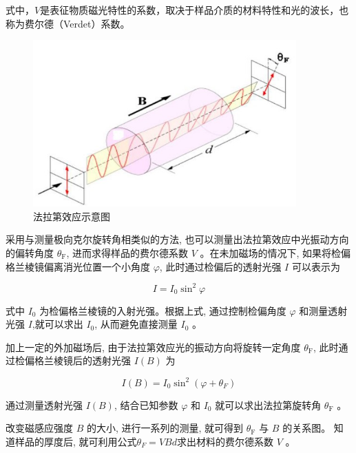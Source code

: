 \documentclass[a4paper,UTF8]{ctexart}
\begin{document}
式中，$V$是表征物质磁光特性的系数，取决于样品介质的材料特性和光的波长，也称为费尔德（Verdet）系数。

\begin{figure}[H]
    \centering
    \begin{minipage}[b]{0.9\textwidth}
        \centering
        \includegraphics[width=0.9\textwidth]{./fig5.jpg}
        \caption{法拉第效应示意图}
    \end{minipage}
\end{figure}

采用与测量极向克尔旋转角相类似的方法, 也可以测量出法拉第效应中光振动方向的偏转角度
 $\theta_{\mathrm{F}}$, 进而求得样品的费尔德系数 $V$ 。在未加磁场的情况下,
  如果将检偏格兰棱镜偏离消光位置一个小角度 $\varphi$, 此时通过检偏后的透射光强 $I$ 可以表示为

\begin{equation}
    I = I_0 \sin^2{\varphi}
\end{equation}

式中 $I_0$ 为检偏格兰棱镜的入射光强。根据上式, 通过控制检偏角度 $\varphi$ 和测量透射光强 $I$,就可以求出 $I_0$, 从而避免直接测量 $I_0$ 。

加上一定的外加磁场后, 由于法拉第效应光的振动方向将旋转一定角度 $\theta_{\mathrm{F}}$, 此时通过检偏格兰棱镜后的透射光强 $I(B)$ 为

\begin{equation}
I(B)=I_0 \sin ^2\left(\varphi+\theta_F\right)
\end{equation}

通过测量透射光强 $I(B)$, 结合已知参数 $\varphi$ 和 $I_0$ 就可以求出法拉第旋转角 $\theta_{\mathrm{F}}$ 。

改变磁感应强度 $B$ 的大小, 进行一系列的测量, 就可得到 $\theta_{\mathrm{F}}$ 与 $B$ 的关系图。
知道样品的厚度后, 就可利用公式$\theta_F = V  B  d$求出材料的费尔德系数 $V$ 。
\end{document}
